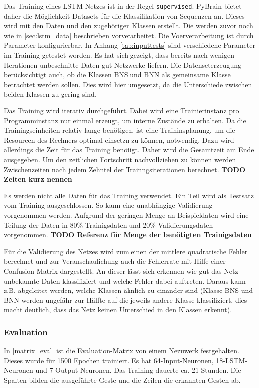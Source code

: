 Das Training eines \ac{LSTM}-Netzes ist in der Regel \texttt{supervised}.
PyBrain bietet daher die Möglichkeit Datasets für die Klassifikation von
Sequenzen an. Dieses wird mit den Daten und den zugehörigen Klassen erstellt.
Die werden zuvor noch wie in \autoref{sec:lstm_data} beschrieben vorverarbeitet.
Die Voerverarbeitung ist durch Parameter konfigurierbar. In Anhang
\autoref{tab:inputtests} sind verschiedene Parameter im Training getestet
worden. Es hat sich gezeigt, dass bereits nach wenigen Iterationen unbeschnitte
Daten gut Netzwerke liefern. Die Datenseterzeugung berücksichtigt auch, ob die
Klassen \ac{BNS} und \ac{BNN} als gemeinsame Klasse betrachtet werden sollen.
Dies wird hier umgesetzt, da die Unterschiede zwischen beiden Klassen zu gering
sind. 

Das Training wird iterativ durchgeführt. Dabei wird eine Trainierinstanz pro
Programminstanz nur einmal erzeugt, um interne Zustände zu erhalten. Da die
Trainingseinheiten relativ lange benötigen, ist eine Traininsplanung, um die
Resourcen des Rechners optimal einsetzn zu können, notwendig. Dazu wird
allerdings die Zeit für das Training benötigt. Daher wird die Gesamtzeit am Ende
ausgegeben. Um den zeitlichen Fortschritt nachvollziehen zu können werden
Zwischenzeiten nach jedem Zehntel der Trainngsiterationen berechnet.
\textbf{TODO Zeiten kurz nennen}

Es werden nicht alle Daten für das Training verwendet. Ein Teil wird als
Testsatz vom Training ausgeschlossen. So kann eine unabhängige Validierung
vorgenommen werden. Aufgrund der geringen Menge an Beispieldaten wird eine
Teilung der Daten in 80\% Trainigsdaten und 20\% Validierungsdaten vorgenommen.
\textbf{TODO Referenz für Menge der benötigten Trainigsdaten}

Für die Validierung des Netzes wird zum einen der mittlere quadratische Fehler
berechnet und zur Veranschaulichung auch die Fehlerrate mit Hilfe einer
Confusion Matrix dargestellt. An dieser lässt sich erkennen wie gut das Netz
unbekannte Daten klassifiziert und welche Fehler dabei auftreten. Daraus kann
z.B.
abgeleitet werden, welche Klassen ähnlich zu einander sind (Klasse \ac{BNS} und
\ac{BNN} werden ungefähr zur Hälfte auf die jeweils andere Klasse klassifiziert,
dies macht deutlich, dass das Netz keinen Unterschied in den Klassen erkennt).


\subsubsection{Evaluation}
In \autoref{matrix_eval} ist die Evaluation-Matrix von einem Nezuwerk festgehalten. 
Dieses wurde für 1500 Epochen trainiert. Es hat 64-Input-Neuronen, 18-LSTM-Neuronen 
und 7-Output-Neuronen. Das Training dauerte ca. 21 Stunden. Die Spalten bilden die 
ausgeführte Geste und die Zeilen die erkannten Gesten ab.


